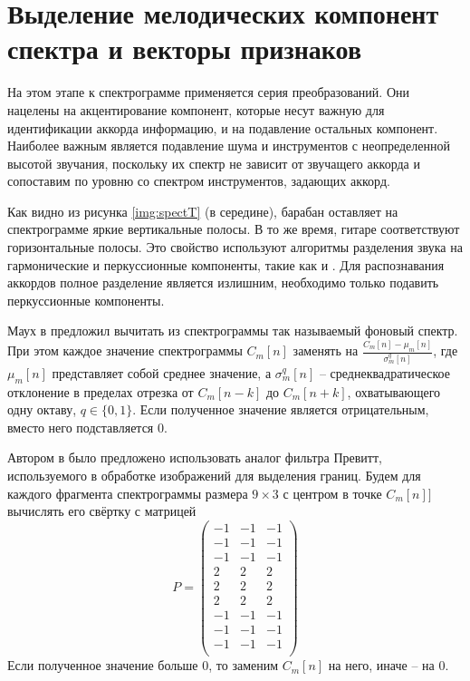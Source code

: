 

\section{Выделение мелодических компонент спектра и векторы признаков}
\label{sect1_feat}

На этом этапе к спектрограмме применяется серия преобразований. Они нацелены на
акцентирование компонент, которые несут важную для идентификации аккорда
информацию, и на подавление остальных компонент. Наиболее важным является
подавление шума и инструментов с неопределенной высотой звучания, поскольку их
спектр не зависит от звучащего аккорда и сопоставим по уровню со спектром
инструментов, задающих аккорд.

Как видно из рисунка \ref{img:spectT} (в середине), барабан оставляет на
спектрограмме яркие вертикальные полосы. В то же время, гитаре соответствуют
горизонтальные полосы. Это свойство используют алгоритмы разделения звука на
гармонические и перкуссионные компоненты, такие как \cite{Ono2008} и
\cite{Fitzgerald2010}. Для распознавания аккордов полное разделение является
излишним, необходимо только подавить перкуссионные компоненты.

Маух в \cite{Mauch2010} предложил вычитать из спектрограммы так называемый
фоновый спектр. При этом каждое значение спектрограммы $C_m[n]$ заменять на
$\frac{C_m[n] - \mu_m[n]}{\sigma_m^q[n]}$, где $\mu_m[n]$ представляет собой
среднее значение, а $\sigma_m^q[n]$ -- среднеквадратическое отклонение в
пределах отрезка от $C_m[n-k]$ до $C_m[n+k]$, охватывающего одну октаву, $q \in
\{0, 1\}$. Если полученное значение является отрицательным, вместо него
подставляется 0.

Автором в \cite{Glazyrin2012} было предложено использовать аналог фильтра
Превитт, используемого в обработке изображений для выделения границ. Будем
для каждого фрагмента спектрограммы размера $9 \times 3$ с центром в точке
$C_m[n]]$ вычислять его свёртку с матрицей
$$P = \begin{pmatrix}
-1 & -1 & -1\\
-1 & -1 & -1\\
-1 & -1 & -1\\
2 & 2 & 2\\
2 & 2 & 2\\
2 & 2 & 2\\
-1 & -1 & -1\\
-1 & -1 & -1\\
-1 & -1 & -1\\
\end{pmatrix}$$
Если полученное значение больше 0, то заменим $C_m[n]$ на него, иначе -- на 0.

